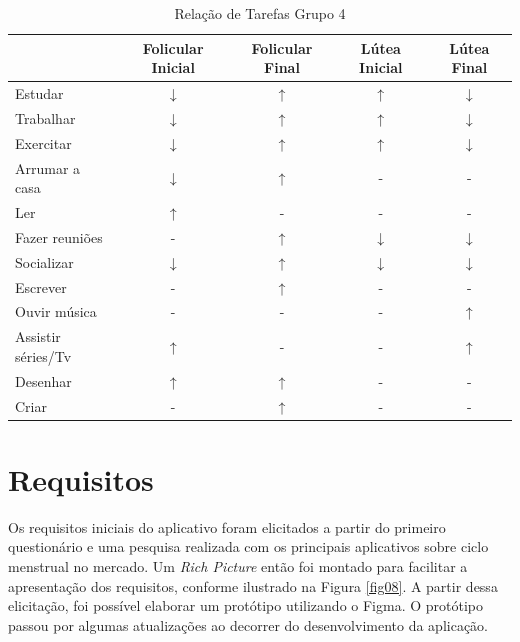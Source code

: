 \begin{table}[]
    \centering
    \caption{Relação de Tarefas Grupo 4}
    \label{tab14}
    \begin{tabular}{|l|c|c|c|c|}
    \hline
    \rowcolor[HTML]{C0C0C0} 
    \multicolumn{1}{|c|}{\cellcolor[HTML]{C0C0C0}Tarefas recomendadas}  & Folicular Inicial & Folicular Final  & Lútea Inicial& Lútea Final \\ \hline
    Estudar & $\downarrow$  & $\uparrow$ & $\uparrow$ & $\downarrow$ \\ \hline
    \rowcolor[HTML]{EFEFEF} 
    Trabalhar & $\downarrow$ & $\uparrow$  & $\uparrow$ &  $\downarrow$  \\ \hline
    Exercitar & $\downarrow$ & $\uparrow$ & $\uparrow$ &  $\downarrow$  \\ \hline
    \rowcolor[HTML]{EFEFEF} 
    Arrumar a casa  & $\downarrow$ & $\uparrow$  & - & - \\ \hline
    Ler & $\uparrow$ & -  & - & - \\ \hline
    \rowcolor[HTML]{EFEFEF} 
    Fazer reuniões & - & $\uparrow$ & $\downarrow$ & $\downarrow$ \\ \hline
    \rowcolor[HTML]{EFEFEF} 
    Socializar & $\downarrow$ & $\uparrow$  & $\downarrow$ & $\downarrow$ \\ \hline
    \rowcolor[HTML]{EFEFEF} 
    Escrever & - & $\uparrow$  & - & - \\ \hline
    Ouvir música & - & - & - & $\uparrow$ \\ \hline
    \rowcolor[HTML]{EFEFEF} 
    Assistir séries/Tv & $\uparrow$ & - & - & $\uparrow$ \\ \hline
    Desenhar & $\uparrow$ & $\uparrow$  & - & - \\ \hline
    \rowcolor[HTML]{EFEFEF} 
    Criar & - & $\uparrow$  & - & - \\ \hline
    \end{tabular}
    \end{table}

\section{Requisitos}

Os requisitos iniciais do aplicativo foram elicitados a partir do primeiro questionário e uma pesquisa realizada 
com os principais aplicativos sobre ciclo menstrual no mercado.  
Um \emph{Rich Picture} então foi montado para facilitar a apresentação dos requisitos, conforme ilustrado na Figura \ref{fig08}.
A partir dessa elicitação, foi possível elaborar um protótipo utilizando o Figma. O protótipo passou por 
algumas atualizações ao decorrer do desenvolvimento da aplicação.

